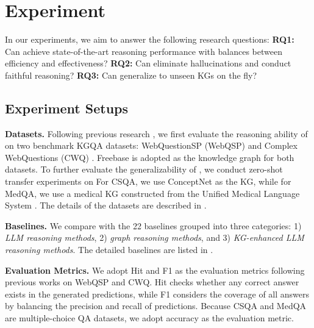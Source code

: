 \section{Experiment}\label{sec:experiment}
In our experiments, we aim to answer the following research questions:
\textbf{RQ1:} Can \ourmethod achieve state-of-the-art reasoning performance with balances between efficiency and effectiveness?
\textbf{RQ2:} Can \ourmethod eliminate hallucinations and conduct faithful reasoning?
\textbf{RQ3:} Can \ourmethod generalize to unseen KGs on the fly? 

\subsection{Experiment Setups}



\noindent\textbf{Datasets.} Following previous research \citep{luo2024rog,sunthink}, we first evaluate the reasoning ability of \ourmethod on two benchmark KGQA datasets: WebQuestionSP (WebQSP) \citep{yih2016value} and Complex WebQuestions (CWQ) \citep{talmor2018web}. Freebase \citep{bollacker2008freebase} is adopted as the knowledge graph for both datasets. To further evaluate the generalizability of \ourmethod, we conduct zero-shot transfer experiments on  For CSQA, we use ConceptNet \citep{speer2017conceptnet} as the KG, while for MedQA, we use a medical KG constructed from the Unified Medical Language System \citep{yasunaga2021qa}.
%
The details of the datasets are described in . 

\noindent\textbf{Baselines.} We compare \ourmethod with the 22 baselines grouped into three categories: 1) \emph{LLM reasoning methods}, 2) \emph{graph reasoning methods}, and 3) \emph{KG-enhanced LLM reasoning methods}. The detailed baselines are listed in .

\noindent\textbf{Evaluation Metrics.} We adopt Hit and F1 as the evaluation metrics following previous works \citep{luo2024rog,sunthink} on WebQSP and CWQ. Hit checks whether any correct answer exists in the generated predictions, while F1 considers the coverage of all answers by balancing the precision and recall of predictions. Because CSQA and MedQA are multiple-choice QA datasets, we adopt accuracy as the evaluation metric.

